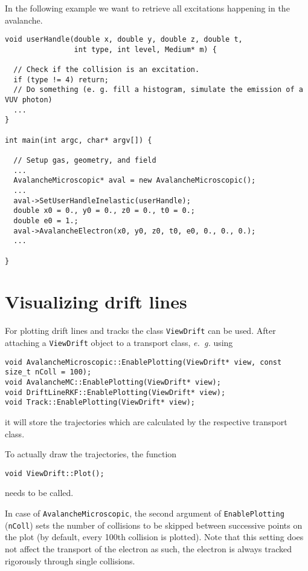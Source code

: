In the following example we want to retrieve  
all excitations happening in the avalanche.
\begin{lstlisting}
void userHandle(double x, double y, double z, double t,
                int type, int level, Medium* m) {

  // Check if the collision is an excitation.
  if (type != 4) return;
  // Do something (e. g. fill a histogram, simulate the emission of a VUV photon) 
  ...
} 

int main(int argc, char* argv[]) {

  // Setup gas, geometry, and field
  ...
  AvalancheMicroscopic* aval = new AvalancheMicroscopic();
  ...
  aval->SetUserHandleInelastic(userHandle);
  double x0 = 0., y0 = 0., z0 = 0., t0 = 0.;
  double e0 = 1.;
  aval->AvalancheElectron(x0, y0, z0, t0, e0, 0., 0., 0.); 
  ...

}

\end{lstlisting}
 
\section{Visualizing drift lines}

For plotting drift lines and tracks the class \texttt{ViewDrift} can be used. 
After attaching a \texttt{ViewDrift} object to a transport class, 
\textit{e.~g.} using
\begin{lstlisting}
void AvalancheMicroscopic::EnablePlotting(ViewDrift* view, const size_t nColl = 100);
void AvalancheMC::EnablePlotting(ViewDrift* view);
void DriftLineRKF::EnablePlotting(ViewDrift* view);
void Track::EnablePlotting(ViewDrift* view);
\end{lstlisting}
it will store the trajectories which are calculated by the respective 
transport class.
 
To actually draw the trajectories, the function 
\begin{lstlisting}
void ViewDrift::Plot();
\end{lstlisting}
needs to be called.

In case of \texttt{AvalancheMicroscopic}, the second argument of 
\texttt{EnablePlotting} (\texttt{nColl}) sets the number of 
collisions to be skipped between successive points on the plot 
(by default, every 100th collision is plotted). 
Note that this setting does not affect the transport of the electron as such, 
the electron is always tracked rigorously through single collisions.


